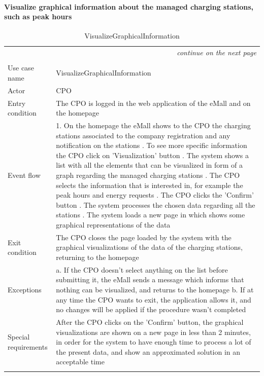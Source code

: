 \paragraph{Visualize graphical information about the managed charging stations, such as peak hours}
\begin{center}
    \begin{longtable}{p{4cm} p{11cm}}
    \multicolumn{2}{r}{\itshape{continue on the next page}}\\
    \endfoot 
    \\
    \endlastfoot
    \hline
     Use case name &  VisualizeGraphicalInformation\\
     \hline
     Actor & CPO \\
     \hline
     Entry condition & The CPO is logged in the web application of the eMall and on the homepage \\
     \hline
     Event flow &   1. On the homepage the eMall shows to the CPO the charging stations associated to the company                   registration and any notification on the stations \newline
                    2. To see more specific information the CPO click on 'Visualization' button \newline 
                    3. The system shows a list with all the elements that can be visualized in form of a graph regarding the managed charging stations \newline
                    4. The CPO selects the information that is interested in, for example the peak hours and energy requests \newline
                    5. The CPO clicks the 'Confirm' button \newline
                    6. The system processes the chosen data regarding all the stations \newline
                    7. The system loads a new page in which shows some graphical representations of the data \\
     \hline
     Exit condition &  The CPO closes the page loaded by the system with the graphical visualizations of the data of the charging stations, returning to the homepage \\
     \hline
     Exceptions &   a. If the CPO doesn't select anything on the list before submitting it, the eMall sends a                       message which informs that nothing can be visualized, and returns to the homepage \newline
                    b. If at any time the CPO wants to exit, the application allows it, and no changes will be applied if the procedure wasn't completed \\
     \hline
     Special requirements & After the CPO clicks on the 'Confirm' button, the graphical visualizations are shown on a new page in less than 2 minutes, in order for the system to have enough time to process a lot of the present data, and show an approximated solution in an acceptable time \\
     \hline
    \caption{VisualizeGraphicalInformation}
    \label{tab:VisualizeGraphicalInformation}
    \end{longtable}
\end{center}
\clearpage